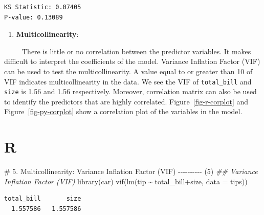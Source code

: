 \documentclass[
  letterpaper,
  DIV=11,
  numbers=noendperiod]{scrreprt}
\newenvironment{Shaded}{\begin{snugshade}}{\end{snugshade}}
\newcommand{\AttributeTok}[1]{\textcolor[rgb]{0.40,0.45,0.13}{#1}}
\newcommand{\CommentTok}[1]{\textcolor[rgb]{0.37,0.37,0.37}{#1}}
\newcommand{\ConstantTok}[1]{\textcolor[rgb]{0.56,0.35,0.01}{#1}}
\newcommand{\DocumentationTok}[1]{\textcolor[rgb]{0.37,0.37,0.37}{\textit{#1}}}
\newcommand{\FunctionTok}[1]{\textcolor[rgb]{0.28,0.35,0.67}{#1}}
\newcommand{\NormalTok}[1]{\textcolor[rgb]{0.00,0.23,0.31}{#1}}
\newcommand{\SpecialCharTok}[1]{\textcolor[rgb]{0.37,0.37,0.37}{#1}}
\newcommand{\StringTok}[1]{\textcolor[rgb]{0.13,0.47,0.30}{#1}}
\providecommand{\tightlist}{%
  \setlength{\itemsep}{0pt}\setlength{\parskip}{0pt}}
\begin{document}
\begin{verbatim}
KS Statistic: 0.07405
P-value: 0.13089
\end{verbatim}

\begin{enumerate}
\def\labelenumi{\arabic{enumi}.}
\setcounter{enumi}{4}
\tightlist
\item
  \textbf{Multicollinearity}:
\end{enumerate}

~~~~~There is little or no correlation between the predictor variables.
It makes difficult to interpret the coefficients of the model. Variance
Inflation Factor (VIF) can be used to test the multicollinearity. A
value equal to or greater than 10 of VIF indicates multicollinearity in
the data. We see the VIF of \texttt{total\_bill} and \texttt{size} is
1.56 and 1.56 respectively. Moreover, correlation matrix can also be
used to identify the predictors that are highly correlated.
Figure~\ref{fig-r-corplot} and Figure~\ref{fig-py-corplot} show a
correlation plot of the variables in the model.

\section{R}

\begin{Shaded}
\begin{Highlighting}[]
\CommentTok{\# 5. Multicollinearity: Variance Inflation Factor (VIF) {-}{-}{-}{-}{-}{-}{-}{-}{-}{-} (5)}
\DocumentationTok{\#\# Variance Inflation Factor (VIF)}
\FunctionTok{library}\NormalTok{(car)}
\FunctionTok{vif}\NormalTok{(}\FunctionTok{lm}\NormalTok{(tip }\SpecialCharTok{\textasciitilde{}}\NormalTok{ total\_bill}\SpecialCharTok{+}\NormalTok{size, }\AttributeTok{data =}\NormalTok{ tips))}
\end{Highlighting}
\end{Shaded}

\begin{verbatim}
total_bill       size 
  1.557586   1.557586 
\end{verbatim}

\begin{Shaded}
\end{Shaded}
\end{document}
